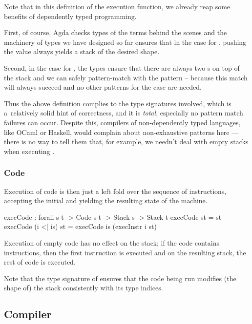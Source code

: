 Note that in this definition of the execution function, we already reap some
benefits of dependently typed programming.

First, of course, Agda checks types of the terms behind
the scenes and the machinery of types we have designed so far ensures that
in the case for , pushing the value  always yields
a stack of the desired shape.

Second, in the case for , the types ensure that there are always two
s on top of the stack and we can safely pattern-match with the
pattern  \scons {} \scons {} -- because this match
will always succeed and no other patterns for the  case are needed. 

Thus the above definition complies to the type signatures involved, which is a~relatively
solid hint of correctness, and it is \emph{total}, especially no pattern match failures
can occur. Despite this, compilers of non-dependently typed languages, like OCaml or Haskell,
would complain about non-exhaustive patterns here --- there is no way to tell them
that, for example, we needn't deal with empty stacks when executing .


\subsubsection{Code}

Execution of code is then just a left fold over the sequence of instructions,
accepting the initial and yielding the resulting state of the machine.

\begin{code}
  execCode : forall {s t} -> Code s t -> Stack s -> Stack t
  execCode \nil st = st
  execCode (i <| is) st = execCode is (execInstr i st)
\end{code}

\noindent Execution of empty code has no effect on the stack; if the code
contains instructions, then the first instruction is executed and on the
resulting stack, the rest of code is executed.

Note that the type signature of  ensures that the code being
run modifies (the shape of) the stack consistently with its type indices.

\subsection{Compiler}

